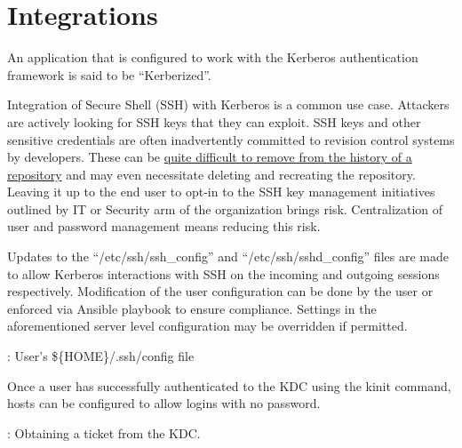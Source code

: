 \section{\label{sec:integration}Integrations}

An application that is configured to work with the Kerberos authentication framework is said to be ``Kerberized''.

\vspace{2mm}
\vspace{2mm}

\justifying
Integration of Secure Shell (SSH) with Kerberos is a common use case. Attackers are actively looking for SSH keys that they can exploit\cite{ssh-key}. SSH
keys and other sensitive credentials are often inadvertently committed to revision control systems by developers. These can be 
\href{https://docs.github.com/en/authentication/keeping-your-account-and-data-secure/removing-sensitive-data-from-a-repository#fully-removing-the-data-from-github}{quite difficult to remove from the history of a repository} and may even necessitate deleting and recreating the repository. Leaving it up to the end user to
opt-in to the SSH key management initiatives outlined by IT or Security arm of the organization brings risk. Centralization of user and password management
means reducing this risk.
\vspace{2mm}

\justifying
Updates to the ``/etc/ssh/ssh\_config'' and ``/etc/ssh/sshd\_config'' files are made to allow Kerberos interactions with SSH on the incoming and outgoing sessions respectively. Modification of the user configuration can be done by the user or enforced via Ansible playbook to ensure compliance. Settings in the aforementioned server level configuration may be overridden if permitted.
\vspace{2mm}

\begin{mybox}{\thetcbcounter: User's \$\{HOME\}/.ssh/config file}
	
\end{mybox}
\vspace{2mm}

\justifying
Once a user has successfully authenticated to the KDC using the kinit command, hosts can be configured to allow logins with no password.

\vspace{2mm}
\begin{mybox}{\thetcbcounter: Obtaining a ticket from the KDC.}
	
\end{mybox}
\vspace{2mm}

